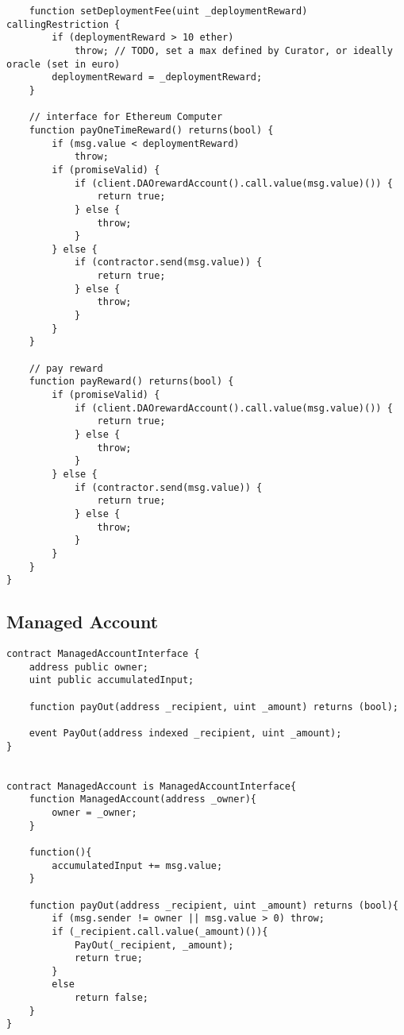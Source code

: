 \documentclass[9pt,oneside]{amsart}
\begin{document}
\begin{appendix}
\begin{verbatim}
    function setDeploymentFee(uint _deploymentReward) callingRestriction {
        if (deploymentReward > 10 ether)
            throw; // TODO, set a max defined by Curator, or ideally oracle (set in euro)
        deploymentReward = _deploymentReward;
    }

    // interface for Ethereum Computer
    function payOneTimeReward() returns(bool) {
        if (msg.value < deploymentReward)
            throw;
        if (promiseValid) {
            if (client.DAOrewardAccount().call.value(msg.value)()) {
                return true;
            } else {
                throw;
            }
        } else {
            if (contractor.send(msg.value)) {
                return true;
            } else {
                throw;
            }
        }
    }

    // pay reward
    function payReward() returns(bool) {
        if (promiseValid) {
            if (client.DAOrewardAccount().call.value(msg.value)()) {
                return true;
            } else {
                throw;
            }
        } else {
            if (contractor.send(msg.value)) {
                return true;
            } else {
                throw;
            }
        }
    }
}
\end{verbatim}


\subsection{Managed Account}\label{app:ManagedAccount}
\begin{verbatim}
contract ManagedAccountInterface {
    address public owner;
    uint public accumulatedInput;

    function payOut(address _recipient, uint _amount) returns (bool);

    event PayOut(address indexed _recipient, uint _amount);
}


contract ManagedAccount is ManagedAccountInterface{
    function ManagedAccount(address _owner){
        owner = _owner;
    }

    function(){
        accumulatedInput += msg.value;
    }

    function payOut(address _recipient, uint _amount) returns (bool){
        if (msg.sender != owner || msg.value > 0) throw;
        if (_recipient.call.value(_amount)()){
            PayOut(_recipient, _amount);
            return true;
        }
        else
            return false;
    }
}
\end{verbatim}
\end{appendix}
\end{document}
